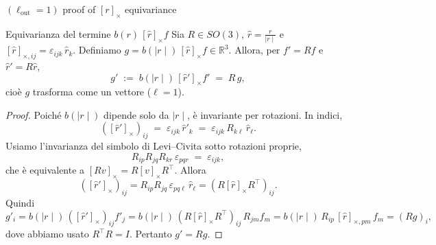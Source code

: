 \documentclass[aspectratio=64,8pt]{beamer}
\begin{document}
\begin{frame}{ \((\ell_\text{out}=1) \) proof of \([r]_\times \) equivariance}
\vspace{-10pt}
    \begin{lemma}{Equivarianza del termine \(b(r)\,[\hat r]_\times f \)}
Sia  \(R\in SO(3) \),  \(\hat r=\tfrac{r}{\mid r \mid} \) e \([\hat r]_{\times,ij}=\varepsilon_{ijk}\,\hat r_k \).
Definiamo  \(g=b(\mid r \mid)\,[\hat r]_\times f\in\mathbb R^3 \). Allora, per  \(f' = R f \) e  \(\hat r' = R \hat r \),
\[
g' \;:=\; b(\mid r \mid)\,[\hat r']_\times f' \;=\; R\,g,
\]
cio\`e \(g \) trasforma come un vettore (\(\ell=1 \)).
\end{lemma}
\vspace{-10pt}
\begin{proof}
Poich\'e  \(b(\mid r\mid ) \) dipende solo da  \(\mid r\mid \), \`e invariante per rotazioni. In indici,
\[
([\hat r']_\times)_{ij} \;=\; \varepsilon_{ijk}\,\hat r'_k
\;=\; \varepsilon_{ijk}\,R_{k\ell}\,\hat r_\ell.
\]
Usiamo l'invarianza del simbolo di Levi--Civita sotto rotazioni proprie,
\[
R_{ip}R_{jq}R_{kr}\,\varepsilon_{pqr} \;=\; \varepsilon_{ijk},
\]
che \`e equivalente a  \([R v]_\times = R [v]_\times R^\top \). Allora
\[
([\hat r']_\times)_{ij}
= R_{ip}R_{jq}\,\varepsilon_{pq\ell}\,\hat r_\ell
= (R[\hat r]_\times R^\top)_{ij}.
\]
Quindi
\[
g'_i = b(\mid r \mid)\,([\hat r']_\times)_{ij} f'_j
= b(\mid r \mid)\,(R[\hat r]_\times R^\top)_{ij}\,R_{jm} f_m
= b(\mid r \mid)\,R_{ip}\,[\hat r]_{\times,pm}\,f_m
= (R g)_i,
\]
dove abbiamo usato \(R^\top R = I\). Pertanto \(g' = R g\).
\end{proof}

\end{frame}
\end{document}
